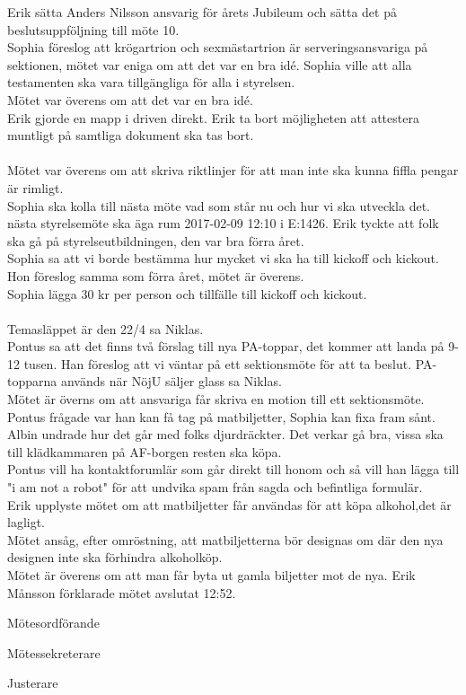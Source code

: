 \documentclass[10pt]{article}
\def\mo{Erik Månsson}
\def\ms{Johan Karlberg}
\def\ji{Niklas Gustafson}
\begin{document}
\begin{paragrafer}
Erik \ypa sätta Anders Nilsson ansvarig för årets Jubileum och sätta det på beslutsuppföljning till möte 10.\\
\Mbaby
{}
Sophia föreslog att krögartrion och sexmästartrion är serveringsansvariga på sektionen, mötet var eniga om att det var en bra idé.
Sophia ville att alla testamenten ska vara tillgängliga för alla i styrelsen.\\
Mötet var överens om att det var en bra idé.\\
Erik gjorde en mapp i driven direkt.
Erik \ypa ta bort möjligheten att attestera muntligt på samtliga dokument ska tas bort.\\
\Mbaby\\
Mötet var överens om att skriva riktlinjer för att man inte ska kunna fiffla pengar är rimligt.\\
Sophia ska kolla till nästa möte vad som står nu och hur vi ska utveckla det.
{\Mba} nästa styrelsemöte ska äga rum 2017-02-09 12:10 i E:1426.
{\Ibfu}
Erik tyckte att folk ska gå på styrelseutbildningen, den var bra förra året.\\
Sophia sa att vi borde bestämma hur mycket vi ska ha till kickoff och kickout. Hon föreslog samma som förra året, mötet är överens.\\
Sophia \ypa lägga 30 kr per person och tillfälle till kickoff och kickout.\\
\Mbaby \\
Temasläppet är den 22/4 sa Niklas.\\
Pontus sa att det finns två förslag till nya PA-toppar, det kommer att landa på 9-12 tusen. Han föreslog att vi väntar på ett sektionsmöte för att ta beslut.
PA-topparna används när NöjU säljer glass sa Niklas.\\
Mötet är överns om att ansvariga får skriva en motion till ett sektionsmöte.\\
Pontus frågade var han kan få tag på matbiljetter, Sophia kan fixa fram sånt.\\
Albin undrade hur det går med folks djurdräckter. Det verkar gå bra, vissa ska till klädkammaren på AF-borgen resten ska köpa.\\
Pontus vill ha kontaktforumlär som går direkt till honom och så vill han lägga till "i am not a robot" för att undvika spam från sagda och befintliga formulär.\\
Erik upplyste mötet om att matbiljetter får användas för att köpa alkohol,det är lagligt.\\
Mötet ansåg, efter omröstning, att matbiljetterna bör designas om där den nya designen inte ska förhindra alkoholköp.\\
Mötet är överens om att man får byta ut gamla biljetter mot de nya.
{\mo} förklarade mötet avslutat 12:52.

\end{paragrafer}

\newpage
\hidesignfoot
\begin{signatures}{3}
\signature{\mo}{Mötesordförande}
\signature{\ms}{Mötessekreterare}
\signature{\ji}{Justerare}
\end{signatures}
\end{document}
